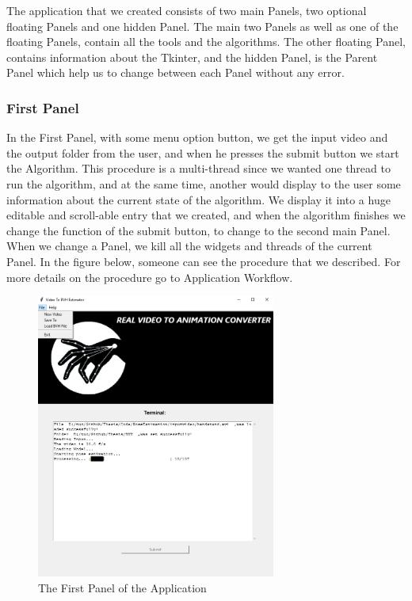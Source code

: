 The application that we created consists of two main Panels, two optional floating Panels and one hidden Panel. The main two Panels as well as one of the floating Panels, contain all the tools and the algorithms. The other floating Panel, contains information about the Tkinter, and the hidden Panel, is the Parent Panel which help us to change between each Panel without any error.

\subsubsection*{First Panel}
In the First Panel, with some menu option button, we get the input video and the output folder from the user, and when he presses the submit button we start the Algorithm. This procedure is a multi-thread since we wanted one thread to run the algorithm, and at the same time, another would display to the user some information about the current state of the algorithm. We display it into a huge editable and scroll-able entry that we created, and when the algorithm finishes we change the function of the submit button, to change to the second main Panel. When we change a Panel, we kill all the widgets and threads of the current Panel. In the figure below, someone can see the procedure that we described. For more details on the procedure go to Application Workflow. 

\pagebreak

\begin{figure}[h]
	\centering
	\includegraphics[width=0.7\textwidth]{figures/Implementation/Panel1.png}
	\captionsetup{labelformat=empty}
	\caption{The First Panel of the Application}
\end{figure}

